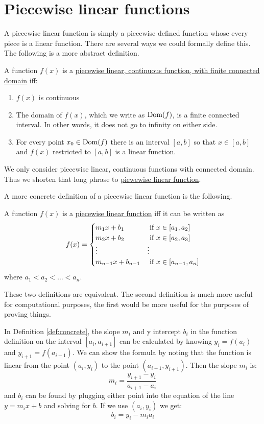 \documentclass[10pt]{article}
\newcommand{\dom}[1]{\ensuremath{\hbox{Dom}(#1)}}
\begin{document}
\section{Piecewise linear functions}
A piecewise linear function is simply a piecewise defined function whose
every piece is a linear function.  There are several ways we could formally
define this.  The following is a more abstract definition.
\begin{definition}
A function $f(x)$ is a \ul{piecewise linear, continuous function, with
finite connected domain} iff:
\begin{enumerate}
\item $f(x)$ is continuous
\item The domain of $f(x)$, which we write as \dom{f}, is a finite connected
interval.  In other words, it does not go to infinity on either side.
\item For every point $x_0 \in \dom{f}$ there is an interval $[a,b]$ so that
$x \in [a,b]$ and $f(x)$ restricted to $[a,b]$ is a linear function.
\end{enumerate}
\end{definition}
\begin{note}
We only consider piecewise linear, continuous functions with connected domain.
Thus we shorten that long phrase to \ul{piewewise linear function}.
\end{note}
A more concrete definition of a piecewise linear function is the following.
\begin{definition}
\label{def:concrete}
A function $f(x)$ is a \ul{piecewise linear function} iff it can be written as
$$f(x) =
\begin{cases}
m_1 x + b_1 & \hbox{ if } x \in [a_1, a_2] \\
m_2 x + b_2 & \hbox{ if } x \in [a_2, a_3] \\
\vdots & \vdots \\
m_{n-1} x + b_{n-1} & \hbox{ if } x \in [a_{n-1}, a_n]
\end{cases}
$$
where $a_1 < a_2 < \ldots < a_n$.
\end{definition}
\begin{note}
These two definitions are equivalent.  The second definition is much more
useful for computational purposes, the first would be more useful for the
purposes of proving things.
\end{note}
\begin{note}
\label{note:mb}
In Definition \ref{def:concrete}, the slope $m_i$ and y intercept $b_i$ in
the function definition on the interval $[a_i, a_{i+1}]$ can be calculated by
knowing $y_i = f(a_i)$ and $y_{i+1}=f(a_{i+1})$.  We can show the formula by
noting that the function is linear from the point $(a_i, y_i)$ to the point
$(a_{i+1}, y_{i+1})$.  Then the slope $m_i$ is:
$$m_i = \frac{y_{i+1}-y_i}{a_{i+1}-a_i}$$
and $b_i$ can be found by plugging either point into the equation of the line
$y=m_ix+b$ and solving for $b$.  If we use $(a_i, y_i)$ we get:
$$b_i=y_i-m_ia_i$$
\end{note}
\end{document}
